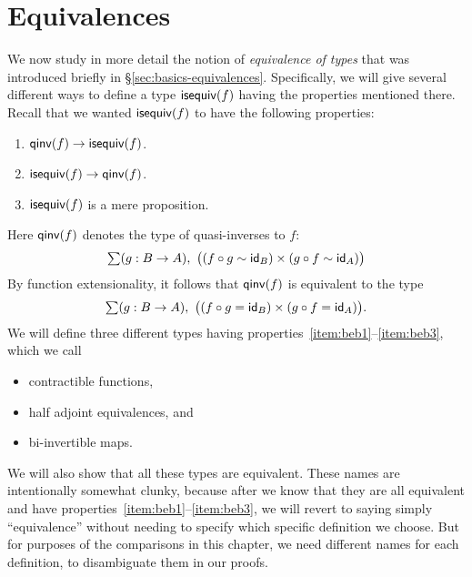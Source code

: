 \newcommand{\lcoh}[3]{\mathtt{cohl}_{#1, #2, #3}}
\newcommand{\rcoh}[3]{\mathtt{cohr}_{#1, #2, #3}}
\newcommand{\lin}[1]{\mathtt{linv}_{#1}}
\newcommand{\rin}[1]{\mathtt{rinv}_{#1}}
\newcommand{\hfib}[2]{\mathtt{fib}_{#1,#2}}

\chapter{Equivalences}
\label{cha:equivalences}

We now study in more detail the notion of \emph{equivalence of types} that was introduced briefly in \S\ref{sec:basics-equivalences}.
Specifically, we will give several different ways to define a type $\mathsf{isequiv}(f)$ having the properties mentioned there.
Recall that we wanted $\mathsf{isequiv}(f)$ to have the following properties:
\begin{enumerate}
\item $\mathsf{qinv}(f) \to \mathsf{isequiv} (f)$.\label{item:beb1}
\item $\mathsf{isequiv} (f) \to \mathsf{qinv}(f)$.\label{item:beb2}
\item $\mathsf{isequiv}(f)$ is a mere proposition.\label{item:beb3}
\end{enumerate}
Here $\mathsf{qinv}(f)$ denotes the type of quasi-inverses to $f$:
\begin{equation*}
  \sm{g:B\to A} \big((f \circ g \htpy \idfunc[B]) \times (g\circ f \htpy \idfunc[A])\big)
\end{equation*}
By function extensionality, it follows that $\mathsf{qinv}(f)$ is equivalent to the type
\begin{equation*}
  \sm{g:B\to A} \big((f \circ g = \idfunc[B]) \times (g\circ f = \idfunc[A])\big).
\end{equation*}
We will define three different types having properties~\ref{item:beb1}--\ref{item:beb3}, which we call
\begin{itemize}
\item contractible functions,
\item half adjoint equivalences, and
\item bi-invertible maps.
\end{itemize}
We will also show that all these types are equivalent.
These names are intentionally somewhat clunky, because after we know that they are all equivalent and have properties~\ref{item:beb1}--\ref{item:beb3}, we will revert to saying simply ``equivalence'' without needing to specify which specific definition we choose.
But for purposes of the comparisons in this chapter, we need different names for each definition, to disambiguate them in our proofs.


